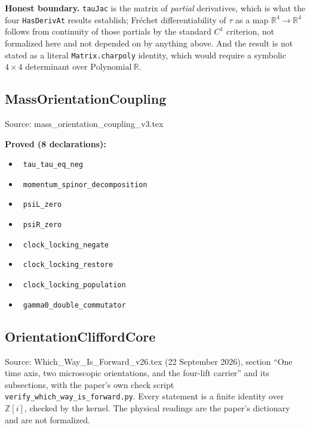 \documentclass{report}
\theoremstyle{definition}
\begin{document}
\begin{itemize}
\begin{itemize}
\textbf{Honest boundary.} \texttt{tauJac} is the matrix of \emph{partial} derivatives, which is
what the four \texttt{HasDerivAt} results establish; Fr\'echet differentiability of $\tau$ as a
map $\mathbb{R}^4\to\mathbb{R}^4$ follows from continuity of those partials by the standard
$C^1$ criterion, not formalized here and not depended on by anything above. And the result is
not stated as a literal \texttt{Matrix.charpoly} identity, which would require a symbolic
$4\times 4$ determinant over $\mathrm{Polynomial}\ \mathbb{R}$.

\subsection{MassOrientationCoupling}
Source: mass\_orientation\_coupling\_v3.tex

\noindent\textbf{Proved (8 declarations):}
\begin{itemize}
  \item {}\leanok\ \texttt{tau\_tau\_eq\_neg}
  \item {}\leanok\ \texttt{momentum\_spinor\_decomposition}
  \item {}\leanok\ \texttt{psiL\_zero}
  \item {}\leanok\ \texttt{psiR\_zero}
  \item {}\leanok\ \texttt{clock\_locking\_negate}
  \item {}\leanok\ \texttt{clock\_locking\_restore}
  \item {}\leanok\ \texttt{clock\_locking\_population}
  \item {}\leanok\ \texttt{gamma0\_double\_commutator}
\end{itemize}

\subsection{OrientationCliffordCore}
Source: Which\_Way\_Is\_Forward\_v26.tex (22 September 2026), section ``One time axis, two
microscopic orientations, and the four-lift carrier'' and its subsections, with the paper's
own check script \texttt{verify\_which\_way\_is\_forward.py}. Every statement is a finite
identity over $\mathbb Z[i]$, checked by the kernel. The physical readings are the paper's
dictionary and are not formalized.


\end{itemize}
\end{itemize}
\end{document}
